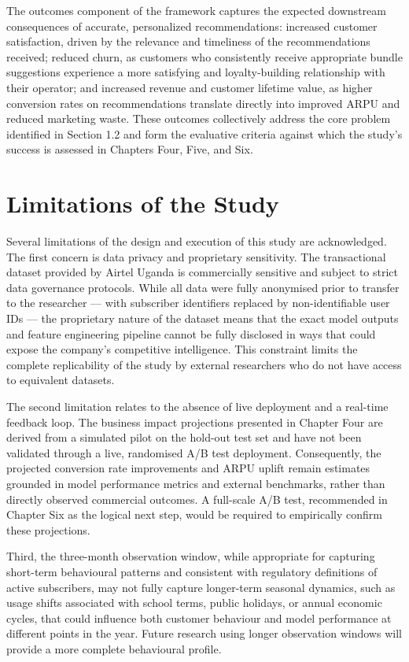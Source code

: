 The outcomes component of the framework captures the expected downstream consequences of accurate, personalized recommendations: increased customer satisfaction, driven by the relevance and timeliness of the recommendations received; reduced churn, as customers who consistently receive appropriate bundle suggestions experience a more satisfying and loyalty-building relationship with their operator; and increased revenue and customer lifetime value, as higher conversion rates on recommendations translate directly into improved ARPU and reduced marketing waste. These outcomes collectively address the core problem identified in Section 1.2 and form the evaluative criteria against which the study's success is assessed in Chapters Four, Five, and Six.


\section{Limitations of the Study}

Several limitations of the design and execution of this study are acknowledged. The first concern is data privacy and proprietary sensitivity. The transactional dataset provided by Airtel Uganda is commercially sensitive and subject to strict data governance protocols. While all data were fully anonymised prior to transfer to the researcher --- with subscriber identifiers replaced by non-identifiable user IDs --- the proprietary nature of the dataset means that the exact model outputs and feature engineering pipeline cannot be fully disclosed in ways that could expose the company's competitive intelligence. This constraint limits the complete replicability of the study by external researchers who do not have access to equivalent datasets.

The second limitation relates to the absence of live deployment and a real-time feedback loop. The business impact projections presented in Chapter Four are derived from a simulated pilot on the hold-out test set and have not been validated through a live, randomised A/B test deployment. Consequently, the projected conversion rate improvements and ARPU uplift remain estimates grounded in model performance metrics and external benchmarks, rather than directly observed commercial outcomes. A full-scale A/B test, recommended in Chapter Six as the logical next step, would be required to empirically confirm these projections.

Third, the three-month observation window, while appropriate for capturing short-term behavioural patterns and consistent with regulatory definitions of active subscribers, may not fully capture longer-term seasonal dynamics, such as usage shifts associated with school terms, public holidays, or annual economic cycles, that could influence both customer behaviour and model performance at different points in the year. Future research using longer observation windows will provide a more complete behavioural profile.

